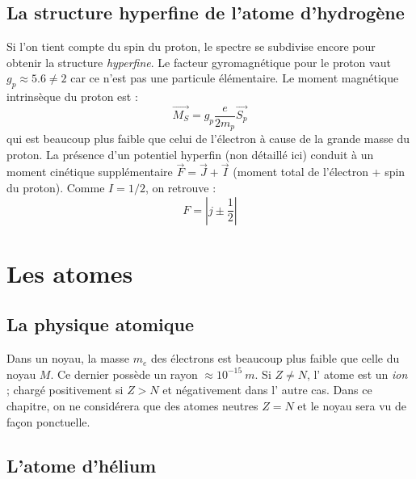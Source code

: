 \documentclass[british,french,11pt, a4paper, openany]{book}
\begin{document}
\section{La structure hyperfine de l'atome d'hydrogène}
Si l'on tient compte du spin du proton, le spectre se subdivise encore pour obtenir
la structure \textit{hyperfine}. Le facteur gyromagnétique pour le proton vaut $
g_p \approx 5.6 \neq 2$ car ce n'est pas une particule élémentaire. Le moment 
magnétique intrinsèque du proton est :
\begin{equation}
	\vec{M_S} = g_p \frac{e}{2m_p}\vec{S_p}
\end{equation}
qui est beaucoup plus faible que celui de l'électron à cause de la grande masse du
proton. La présence d'un potentiel hyperfin (non détaillé ici) conduit à un moment
cinétique supplémentaire $\vec{F}=\vec{J}+\vec{I}$ (moment total de l'électron +
spin du proton). Comme $I = 1/2$, on retrouve :
\begin{equation}
	F = \left|j\pm\frac{1}{2}\right|
\end{equation}








\chapter{Les atomes}
\section{La physique atomique}
Dans un noyau, la masse $m_e$ des électrons est beaucoup plus faible que celle du
noyau $M$. Ce dernier possède un rayon $\approx 10^{-15}\ m$. Si $Z \neq N$, l'
atome est un \textit{ion} ; chargé positivement si $Z>N$ et négativement dans l'
autre cas. Dans ce chapitre, on ne considérera que des atomes neutres $Z=N$ et le
noyau sera vu de façon ponctuelle.

\section{L'atome d'hélium}
\end{document}
